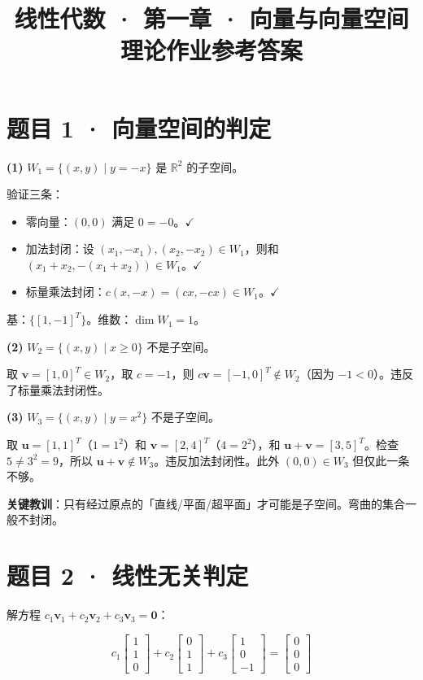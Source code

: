 \documentclass[12pt]{ctexart}
\title{线性代数 · 第一章 · 向量与向量空间 \\ 理论作业参考答案}
\author{}
\date{}
\begin{document}
\maketitle

\section*{题目 1 · 向量空间的判定}

\textbf{(1)} $W_1 = \{(x, y) \mid y = -x\}$ 是 $\mathbb{R}^2$ 的子空间。

验证三条：
\begin{itemize}
    \item 零向量：$(0, 0)$ 满足 $0 = -0$。$\checkmark$
    \item 加法封闭：设 $(x_1, -x_1), (x_2, -x_2) \in W_1$，则和 $(x_1+x_2, -(x_1+x_2)) \in W_1$。$\checkmark$
    \item 标量乘法封闭：$c(x, -x) = (cx, -cx) \in W_1$。$\checkmark$
\end{itemize}

基：$\{[1, -1]^T\}$。维数：$\dim W_1 = 1$。

\textbf{(2)} $W_2 = \{(x, y) \mid x \geq 0\}$ 不是子空间。

取 $\mathbf{v} = [1, 0]^T \in W_2$，取 $c = -1$，则 $c\mathbf{v} = [-1, 0]^T \notin W_2$（因为 $-1 < 0$）。违反了标量乘法封闭性。

\textbf{(3)} $W_3 = \{(x, y) \mid y = x^2\}$ 不是子空间。

取 $\mathbf{u} = [1, 1]^T$（$1 = 1^2$）和 $\mathbf{v} = [2, 4]^T$（$4 = 2^2$），和 $\mathbf{u} + \mathbf{v} = [3, 5]^T$。检查 $5 \neq 3^2 = 9$，所以 $\mathbf{u} + \mathbf{v} \notin W_3$。违反加法封闭性。此外 $(0,0) \in W_3$ 但仅此一条不够。

\textbf{关键教训}：只有经过原点的「直线/平面/超平面」才可能是子空间。弯曲的集合一般不封闭。

\section*{题目 2 · 线性无关判定}

解方程 $c_1\mathbf{v}_1 + c_2\mathbf{v}_2 + c_3\mathbf{v}_3 = \mathbf{0}$：

\[
c_1\begin{bmatrix}1\\1\\0\end{bmatrix} +
c_2\begin{bmatrix}0\\1\\1\end{bmatrix} +
c_3\begin{bmatrix}1\\0\\-1\end{bmatrix} =
\begin{bmatrix}0\\0\\0\end{bmatrix}
\]
\end{document}
